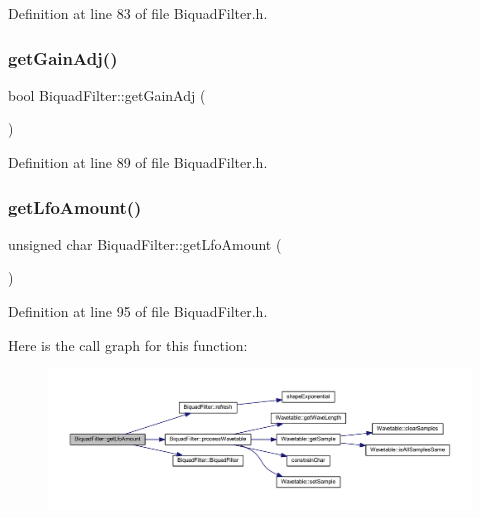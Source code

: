Definition at line 83 of file Biquad\+Filter.\+h.

\mbox{\label{class_biquad_filter_a6273d6f759d29500443dd9991125e763}} 
\subsubsection{\texorpdfstring{get\+Gain\+Adj()}{getGainAdj()}}
{\footnotesize\ttfamily bool Biquad\+Filter\+::get\+Gain\+Adj (\begin{DoxyParamCaption}{ }\end{DoxyParamCaption})\hspace{0.3cm}{\ttfamily [inline]}}



Definition at line 89 of file Biquad\+Filter.\+h.

\mbox{\label{class_biquad_filter_aa6cee8e0caed47a12edb5f58b40b0561}} 
\subsubsection{\texorpdfstring{get\+Lfo\+Amount()}{getLfoAmount()}}
{\footnotesize\ttfamily unsigned char Biquad\+Filter\+::get\+Lfo\+Amount (\begin{DoxyParamCaption}{ }\end{DoxyParamCaption})\hspace{0.3cm}{\ttfamily [inline]}}



Definition at line 95 of file Biquad\+Filter.\+h.

Here is the call graph for this function\+:
\nopagebreak
\begin{figure}[H]
\begin{center}
\leavevmode
\includegraphics[width=350pt]{class_biquad_filter_aa6cee8e0caed47a12edb5f58b40b0561_cgraph}
\end{center}
\end{figure}
\mbox{\label{class_biquad_filter_a579a1df530fc036f7d8a28e38b1f760c}} 
